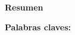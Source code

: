 \thispagestyle{plain}
\begin{center}
	\vspace*{1.5cm}
	{\Large \bfseries  Resumen}
\end{center}
\vspace{0.5cm}


\textbf{Palabras claves: }